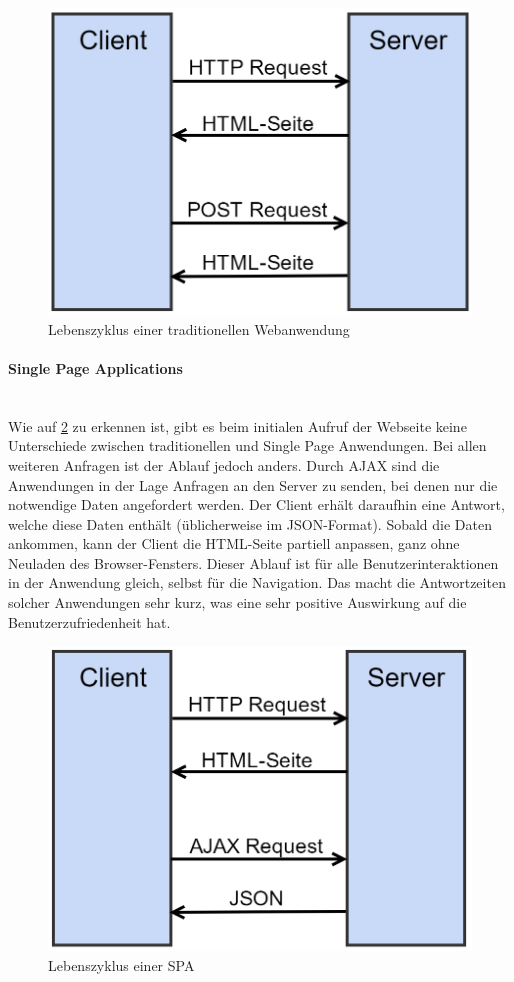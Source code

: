 \begin{figure}[ht!]
	\centering
	\includegraphics[width=0.5\linewidth]{bilder/kap2/trad_web}
	\caption{Lebenszyklus einer traditionellen Webanwendung}
	\label{fig:traditional-web}
\end{figure}

\paragraph{Single Page Applications}$\;$ \\
Wie auf \cref{fig:spa} zu erkennen ist, gibt es beim initialen Aufruf der Webseite keine Unterschiede zwischen traditionellen und Single Page Anwendungen. Bei allen weiteren Anfragen ist der Ablauf jedoch anders. Durch AJAX sind die Anwendungen in der Lage Anfragen an den Server zu senden, bei denen nur die notwendige Daten angefordert werden. Der Client erhält daraufhin eine Antwort, welche diese Daten enthält (üblicherweise im \acs{JSON}-Format). Sobald die Daten ankommen, kann der Client die HTML-Seite partiell anpassen, ganz ohne Neuladen des Browser-Fensters. Dieser Ablauf ist für alle Benutzerinteraktionen in der Anwendung gleich, selbst für die Navigation. Das macht die Antwortzeiten solcher Anwendungen sehr kurz, was eine sehr positive Auswirkung auf die Benutzerzufriedenheit hat.

\begin{figure}[ht!]
	\centering
	\includegraphics[width=0.5\linewidth]{bilder/kap2/spa}
	\caption{Lebenszyklus einer \acs{SPA}}
	\label{fig:spa}
\end{figure}






